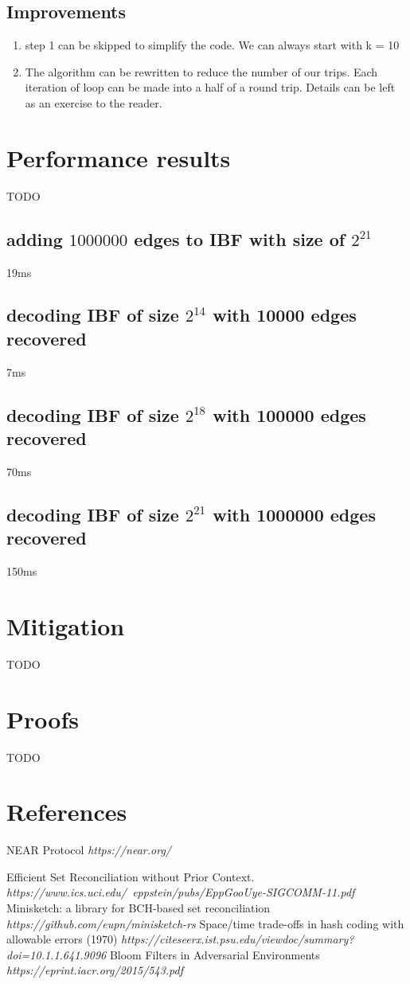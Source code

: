 \documentclass[11pt]{article}
\begin{document}
\subsection{Improvements}
\begin{enumerate}
\item step 1 can be skipped to simplify the code. We can always start with k = 10
\item The algorithm can be rewritten to reduce the number of our trips. Each iteration of loop can be made into a half of a round trip.
Details can be left as an exercise to the reader.
\end{enumerate}


\section{Performance results}
TODO
\subsection{adding $1000000$ edges to IBF with size of $2^{21}$}
19ms
\subsection{decoding IBF of size $2^{14}$ with 10000 edges recovered}
7ms
\subsection{decoding IBF of size $2^{18}$ with 100000 edges recovered}
70ms
\subsection{decoding IBF of size $2^{21}$ with 1000000 edges recovered}
150ms

\section{Mitigation}\label{sec:mitigation}
TODO

\section{Proofs}
TODO

\section{References}

\begin{thebibliography}{9}
NEAR Protocol
\textit{https://near.org/}

Efficient Set Reconciliation without Prior Context.
\textit{https://www.ics.uci.edu/~eppstein/pubs/EppGooUye-SIGCOMM-11.pdf}
Minisketch: a library for BCH-based set reconciliation
\textit{https://github.com/eupn/minisketch-rs}
Space/time trade-offs in hash coding with allowable errors (1970)
\textit{https://citeseerx.ist.psu.edu/viewdoc/summary?doi=10.1.1.641.9096}
Bloom Filters in Adversarial Environments
\textit{https://eprint.iacr.org/2015/543.pdf}
\end{thebibliography}
\end{document}

